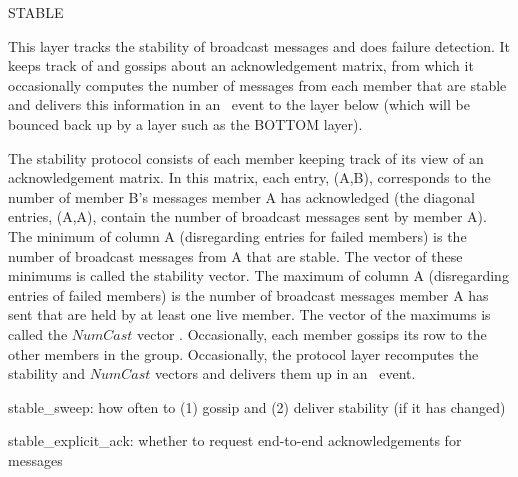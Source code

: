 %
%
%
\begin{Layer}{STABLE}

This layer tracks the stability of broadcast messages and does
failure detection.  It keeps track of and gossips about an
acknowledgement matrix, from which it occasionally computes the
number of messages from each member that are stable and delivers this
information in an \DnStable\ event to the layer below (which will be
bounced back up by a layer such as the BOTTOM layer).

\begin{Protocol}
The stability protocol consists of each member keeping track of its
view of an acknowledgement matrix.  In this matrix, each entry,
(A,B), corresponds to the number of member B's messages member A has
acknowledged (the diagonal entries, (A,A), contain the number of
broadcast messages sent by member A).  The minimum of column A
(disregarding entries for failed members) is the number of broadcast
messages from A that are stable.  The vector of these minimums is
called the stability vector.  The maximum of column A (disregarding
entries of failed members) is the number of broadcast messages member
A has sent that are held by at least one live member.  The vector of
the maximums is called the $NumCast$ vector .  Occasionally, each member gossips its row to the
other members in the group.  Occasionally, the protocol layer
recomputes the stability and $NumCast$ vectors and delivers them up
in an \DnStable\ event.
\end{Protocol}

\begin{Parameters}
\item 
stable\_sweep: how often to (1) gossip and (2) deliver stability (if
it has changed)
\item 
stable\_explicit\_ack: whether to request end-to-end acknowledgements
for messages
\end{Parameters}


\end{Layer}

